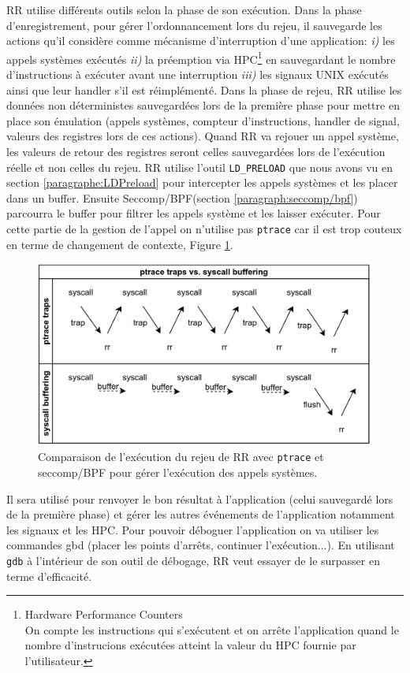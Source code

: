 RR utilise différents outils selon la phase de son
exécution\citep{RRimplem}. Dans la phase d'enregistrement, pour gérer
l'ordonnancement lors du rejeu, il sauvegarde les actions qu'il considère comme
mécanisme d'interruption d'une application: \textit{i)} les appels systèmes
exécutés \textit{ii)} la préemption via HPC\footnote{Hardware Performance
  Counters \\ On compte les instructions qui s'exécutent et on arrête
  l'application quand le nombre d'instrucions exécutées atteint la valeur du HPC
  fournie par l'utilisateur.} en sauvegardant le nombre d'instructions à exécuter
avant une interruption \textit{iii)} les signaux UNIX exécutés ainsi que leur
handler s'il est réimplémenté. Dans la phase de rejeu, RR utilise les données
non déterministes sauvegardées lors de la première phase pour mettre en place
son émulation (appels systèmes, compteur d'instructions, handler de signal,
valeurs des registres lors de ces actions). Quand RR va rejouer un appel système,
les valeurs de retour des registres seront celles sauvegardées lors de
l'exécution réelle et non celles du rejeu. RR utilise l'outil \texttt{LD\_PRELOAD} que nous avons vu en section \ref{paragraphe:LDPreload} pour intercepter les appels systèmes et les
placer dans un buffer. Ensuite Seccomp/BPF(section \ref{paragraph:seccomp/bpf})
parcourra le buffer pour filtrer les appels système et les laisser
exécuter. Pour cette partie de la gestion de l'appel on n'utilise pas \texttt{ptrace} car
il est trop couteux en terme de changement de contexte, Figure \ref{AS_RR}.
\begin{figure}
\centering \includegraphics[scale=0.30]{Pictures/png/RR_AS}
\caption{Comparaison de l'exécution du rejeu de RR avec \texttt{ptrace} et seccomp/BPF
  pour gérer l'exécution des appels systèmes.}
\label{AS_RR}
\end{figure}
Il sera utilisé pour renvoyer le bon résultat à l'application (celui sauvegardé
lors de la première phase) et gérer les autres événements de l'application
notamment les signaux et les HPC. Pour pouvoir déboguer l'application on va
utiliser les commandes gbd (placer les points d'arrêts, continuer
l'exécution...). En utilisant \texttt{gdb} à l'intérieur de son outil de débogage, RR
veut essayer de le surpasser en terme d'efficacité.

